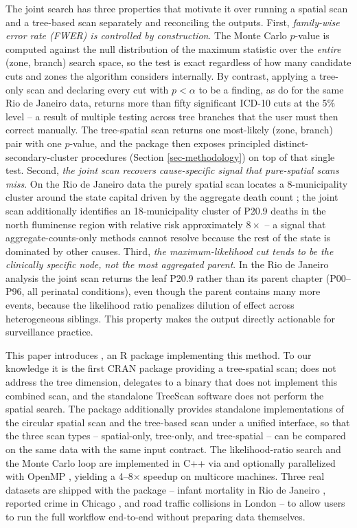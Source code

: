 The joint search has three properties that motivate it over running a
spatial scan and a tree-based scan separately and reconciling the outputs.
First, \emph{family-wise error rate (FWER) is controlled by construction}. The
Monte Carlo \(p\)-value is computed against the null distribution of the
maximum statistic over the \emph{entire} (zone, branch) search space, so the
test is exact regardless of how many candidate cuts and zones the
algorithm considers internally. By contrast, applying a tree-only scan and
declaring every cut with \(p < \alpha\) to be a finding, as \citet{kulldorff2003}
do for the same Rio de Janeiro data, returns more than fifty significant
ICD-10 cuts at the 5\% level \citep[Table 6]{cancado2025} -- a result of
multiple testing across tree branches that the user must then correct
manually. The tree-spatial scan returns one most-likely (zone, branch)
pair with one \(p\)-value, and the package then exposes principled
distinct-secondary-cluster procedures (Section \ref{sec-methodology}) on
top of that single test. Second, \emph{the joint scan recovers cause-specific
signal that pure-spatial scans miss}. On the Rio de Janeiro data the
purely spatial scan locates a 8-municipality cluster around the state
capital driven by the aggregate death count \citep[Table 5]{cancado2025}; the
joint scan additionally identifies an 18-municipality cluster of P20.9
deaths in the north fluminense region with relative risk approximately
\(8\times\) -- a signal that aggregate-counts-only methods cannot resolve
because the rest of the state is dominated by other causes. Third, \emph{the
maximum-likelihood cut tends to be the clinically specific node, not the
most aggregated parent}. In the Rio de Janeiro analysis the joint scan
returns the leaf P20.9 rather than its parent chapter (P00--P96, all
perinatal conditions), even though the parent contains many more events,
because the likelihood ratio penalizes dilution of effect across
heterogeneous siblings. This property makes the output directly
actionable for surveillance practice.

This paper introduces , an R package implementing this
method. To our knowledge it is the first CRAN package providing a
tree-spatial scan;  does not address the tree
dimension,  delegates to a binary that does not implement
this combined scan, and the standalone TreeScan software does not perform
the spatial search. The package additionally provides standalone
implementations of the circular spatial scan \citep{kulldorff1997} and the
tree-based scan \citep{kulldorff2003} under a unified interface, so that the
three scan types -- spatial-only, tree-only, and tree-spatial -- can be
compared on the same data with the same input contract. The likelihood-ratio
search and the Monte Carlo loop are implemented in C++ via 
\citep{rcpp} and optionally parallelized with OpenMP \citep{openmp}, yielding a
4--8\(\times\) speedup on multicore machines. Three real datasets are shipped
with the package -- infant mortality in Rio de Janeiro \citep{datasus, ibge},
reported crime in Chicago \citep{chicagoportal}, and road traffic collisions in
London \citep{stats19} -- to allow users to run the full workflow end-to-end
without preparing data themselves.

